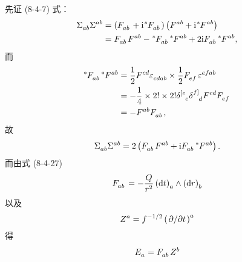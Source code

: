 \begin{xiti}
    \begin{zm}
        先证 (8-4-7) 式：
        \begin{equation*}
            \begin{split}
                \tensor{\Sigma}{_a_b} \tensor{\Sigma}{^a^b} &= \left( \tensor{F}{_a_b} + \ii \tensor[^*]{F}{_a_b} \right) \left( \tensor{F}{^a^b} + \ii \tensor[^*]{F}{^a^b} \right)\\
                &= \tensor{F}{_a_b} \tensor{F}{^a^b} - \tensor[^*]{F}{_a_b} \tensor[^*]{F}{^a^b} + 2\ii \tensor{F}{_a_b} \tensor[^*]{F}{^a^b},
            \end{split}
        \end{equation*}
        而
        \begin{equation*}
            \begin{split}
                \tensor[^*]{F}{_a_b} \tensor[^*]{F}{^a^b} &= \frac{1}{2} \tensor{F}{^c^d} \tensor{\varepsilon}{_c_d_a_b} \times \frac{1}{2} \tensor{F}{_e_f} \tensor{\varepsilon}{^e^f^a^b}\\
                &= - \frac{1}{4} \times 2! \times 2! \tensor{\delta}{^{[e}_c} \tensor{\delta}{^{f]}_d} \tensor{F}{^c^d} \tensor{F}{_e_f}\\
                &= - \tensor{F}{^a^b} \tensor{F}{_a_b},
            \end{split}
        \end{equation*}
        故
        \begin{equation*}
            \begin{split}
                \tensor{\Sigma}{_a_b} \tensor{\Sigma}{^a^b} = 2 \left( \tensor{F}{_a_b} \tensor{F}{^a^b} + \ii \tensor{F}{_a_b} \tensor[^*]{F}{^a^b} \right).
            \end{split}
        \end{equation*}
        而由式 (8-4-27) 
        \begin{equation*}
            \tensor{F}{_a_b} = - \frac{Q}{r^2} \tensor{\left( \dd{t} \right)}{_a} \wedge \tensor{\left( \dd{r} \right)}{_b}
        \end{equation*}
        以及
        \begin{equation*}
            \tensor{Z}{^a} = f^{-1/2} \tensor{\left( \pdv*{t} \right)}{^a}
        \end{equation*}
        得
        \begin{equation*}
            \begin{split}
                \tensor{E}{_a} &= \tensor{F}{_a_b} \tensor{Z}{^b}\\

\end{split}
\end{equation*}
\end{zm}
\end{xiti}

